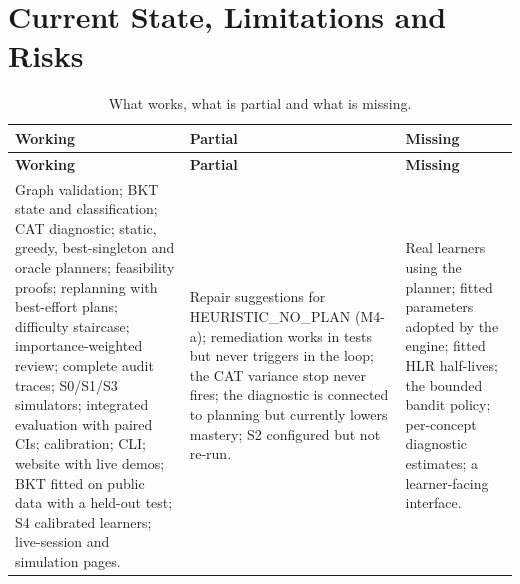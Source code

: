 \documentclass[english]{sintr}
\begin{document}
\section{Current State, Limitations and Risks}
\label{sec:limits}
{\small
\begin{longtable}{|L{5.04cm}|L{5.04cm}|L{4.95cm}|}
\caption{What works, what is partial and what is missing.}\\
\hline
\textbf{Working} & \textbf{Partial} & \textbf{Missing} \\ \hline
\endfirsthead
\hline \textbf{Working} & \textbf{Partial} & \textbf{Missing} \\ \hline
\endhead
Graph validation; BKT state and classification; CAT diagnostic; static, greedy, best-singleton and oracle planners; feasibility proofs; replanning with best-effort plans; difficulty staircase; importance-weighted review; complete audit traces; S0/S1/S3 simulators; integrated evaluation with paired CIs; calibration; CLI; website with live demos; BKT fitted on public data with a held-out test; S4 calibrated learners; live-session and simulation pages.
& Repair suggestions for HEURISTIC\_NO\_PLAN (M4-a); remediation works in tests but never triggers in the loop; the CAT variance stop never fires; the diagnostic is connected to planning but currently lowers mastery; S2 configured but not re-run.
& Real learners using the planner; fitted parameters adopted by the engine; fitted HLR half-lives; the bounded bandit policy; per-concept diagnostic estimates; a learner-facing interface. \\ \hline
\end{longtable}
}
\end{document}
